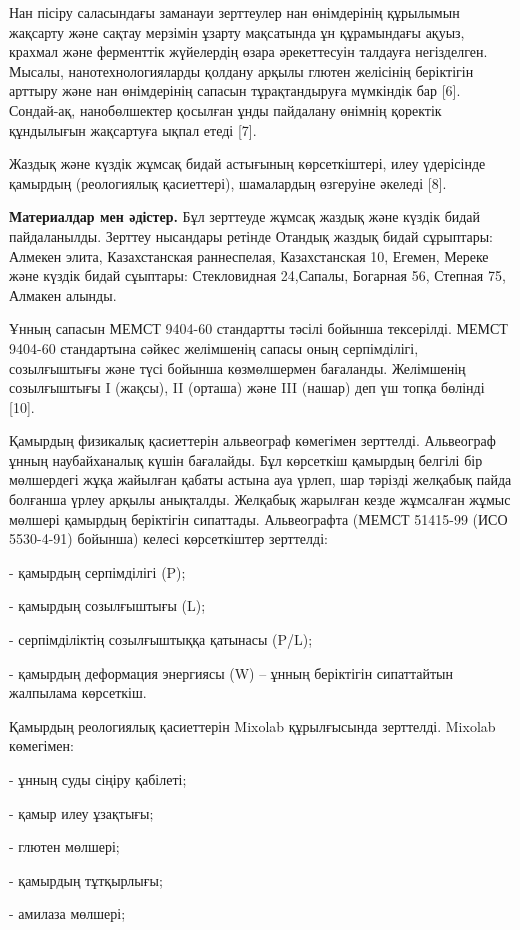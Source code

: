 \begin{multicols}{2}
Нан пісіру саласындағы заманауи зерттеулер нан өнімдерінің құрылымын
жақсарту және сақтау мерзімін ұзарту мақсатында ұн құрамындағы ақуыз,
крахмал және ферменттік жүйелердің өзара әрекеттесуін талдауға
негізделген. Мысалы, нанотехнологияларды қолдану арқылы глютен желісінің
беріктігін арттыру және нан өнімдерінің сапасын тұрақтандыруға мүмкіндік
бар {[}6{]}. Сондай-ақ, нанобөлшектер қосылған ұнды пайдалану өнімнің
қоректік құндылығын жақсартуға ықпал етеді {[}7{]}.

Жаздық және күздік жұмсақ бидай астығының көрсеткіштері, илеу үдерісінде
қамырдың (реологиялық қасиеттері), шамалардың өзгеруіне әкеледі {[}8{]}.

{\bfseries Материалдар мен әдістер.} Бұл зерттеуде жұмсақ жаздық және
күздік бидай пайдаланылды. Зерттеу нысандары ретінде Отандық жаздық
бидай сұрыптары: Алмекен элита, Казахстанская раннеспелая, Казахстанская
10, Егемен, Мереке және күздік бидай сұыптары: Стекловидная 24,Сапалы,
Богарная 56, Степная 75, Алмакен алынды.

Ұнның сапасын МЕМСТ 9404-60 стандартты тәсілі бойынша тексерілді. МЕМСТ
9404-60 стандартына сәйкес желімшенің сапасы оның серпімділігі,
созылғыштығы және түсі бойынша көзмөлшермен бағаланды. Желімшенің
созылғыштығы I (жақсы), II (орташа) және III (нашар) деп үш топқа
бөлінді {[}10{]}.

Қамырдың физикалық қасиеттерін альвеограф көмегімен зерттелді.
Альвеограф ұнның наубайханалық күшін бағалайды. Бұл көрсеткіш қамырдың
белгілі бір мөлшердегі жұқа жайылған қабаты астына ауа үрлеп, шар
тәрізді желқабық пайда болғанша үрлеу арқылы анықталды. Желқабық
жарылған кезде жұмсалған жұмыс мөлшері қамырдың беріктігін сипаттады.
Альвеографта (МЕМСТ 51415-99 (ИСО 5530-4-91) бойынша) келесі
көрсеткіштер зерттелді:

- қамырдың серпімділігі (P);

- қамырдың созылғыштығы (L);

- серпімділіктің созылғыштыққа қатынасы (P/L);

- қамырдың деформация энергиясы (W) -- ұнның беріктігін сипаттайтын
жалпылама көрсеткіш.

Қамырдың реологиялық қасиеттерін Mixolab құрылғысында зерттелді. Mixolab
көмегімен:

- ұнның суды сіңіру қабілеті;

- қамыр илеу ұзақтығы;

- глютен мөлшері;

- қамырдың тұтқырлығы;

- амилаза мөлшері;


\end{multicols}
